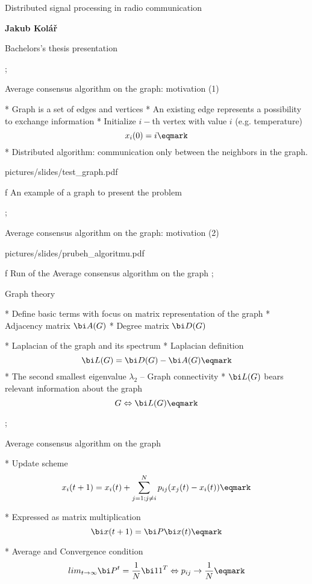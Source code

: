 

\worktype[B/EN]

\slideshow 

\tit Distributed signal processing \nl in radio communication

\subtit\bf Jakub Kolář

\subtit\rm Bachelors's thesis presentation

\pg; %


\sec Average consensus algorithm \nl on the graph: motivation (1)

* Graph is a set of edges and vertices
* An existing edge represents a possibility to exchange information
* Initialize $i-$th vertex with value $i$ (e.g. temperature)
$$x_i(0)=i \eqmark$$
* Distributed algorithm: communication only between the neighbors in the graph.  
\medskip
\centerline{\picw=9cm \inspic pictures/slides/test_graph.pdf } 
\caption/f { An example of a graph to present the problem }

\pg;

\sec Average consensus algorithm \nl on the graph: motivation (2)


\medskip
\centerline{\picw=12cm \inspic pictures/slides/prubeh_algoritmu.pdf } 
\caption/f { Run of the  Average consensus algorithm on the graph }
\pg;

\sec Graph theory

* Define basic terms with focus on matrix representation of the graph
\begitems
*   Adjacency matrix ${\bi A}(G)$
*   Degree matrix  ${\bi D}(G)$
\enditems

* Laplacian of the graph and its spectrum
\begitems
  * Laplacian definition  $${\bi L}(G) = {\bi D}(G) - {\bi A}(G) \eqmark $$
  * The second smallest eigenvalue $\lambda_2$ -- Graph connectivity
\enditems
*  ${\bi L}(G)$ bears relevant information about the graph 
$$ G \Leftrightarrow {\bi L}(G) \eqmark$$

\pg;

\sec Average consensus algorithm \nl on the graph

* Update scheme \nl $$ x_i(t+1) = x_i(t)+\sum_{j=1; j\not= i}^N p_{ij}(x_j(t)-x_i(t)) \eqmark $$

* Expressed as matrix multiplication \nl $$ {\bi x}(t+1) = {\bi P} {\bi x}(t) \eqmark $$

* Average and Convergence condition \nl $$ lim_{t\rightarrow\infty} {\bi P}^t = {1\over N}{\bi 1 1}^T \Leftrightarrow  p_{ij} \rightarrow {1\over N} \eqmark $$

